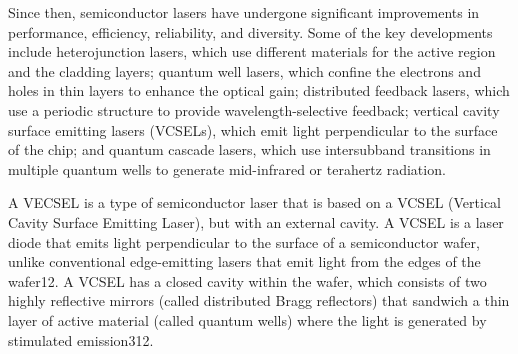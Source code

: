 Since then, semiconductor lasers have undergone significant improvements in performance, efficiency, reliability, and diversity. Some of the key developments include heterojunction lasers, which use different materials for the active region and the cladding layers; quantum well lasers, which confine the electrons and holes in thin layers to enhance the optical gain; distributed feedback lasers, which use a periodic structure to provide wavelength-selective feedback; vertical cavity surface emitting lasers (VCSELs), which emit light perpendicular to the surface of the chip; and quantum cascade lasers, which use intersubband transitions in multiple quantum wells to generate mid-infrared or terahertz radiation.

A VECSEL is a type of semiconductor laser that is based on a VCSEL (Vertical Cavity Surface Emitting Laser), but with an external cavity. A VCSEL is a laser diode that emits light perpendicular to the surface of a semiconductor wafer, unlike conventional edge-emitting lasers that emit light from the edges of the wafer12. A VCSEL has a closed cavity within the wafer, which consists of two highly reflective mirrors (called distributed Bragg reflectors) that sandwich a thin layer of active material (called quantum wells) where the light is generated by stimulated emission312.





